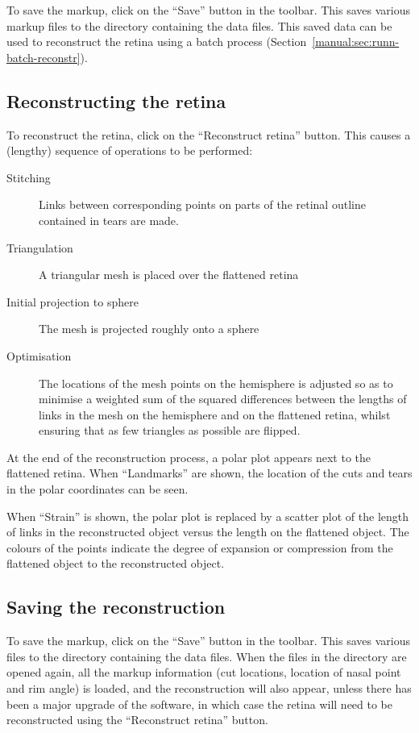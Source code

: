 \documentclass{article}
\begin{document}
To save the markup, click on the ``Save'' button in the toolbar. This
saves various markup files to the directory containing the
data files. This saved data can be used to reconstruct the retina using
a batch process (Section~\ref{manual:sec:runn-batch-reconstr}).

\subsection{Reconstructing the retina}
\label{manual:sec:reconstr-retina}

To reconstruct the retina, click on the ``Reconstruct retina''
button. This causes a (lengthy) sequence of operations to be performed:
\begin{description}
\item[Stitching] Links between corresponding points on parts of the retinal
  outline  contained in tears are made.
\item[Triangulation] A triangular mesh is placed over the flattened retina
\item[Initial projection to sphere ] The mesh is projected roughly
  onto a sphere
\item[Optimisation] The locations of the mesh points on the hemisphere
  is adjusted so as to minimise a weighted sum of the squared
  differences between the lengths of links in the mesh on the
  hemisphere and on the flattened retina, whilst ensuring that as few
  triangles as possible are flipped.
\end{description}

At the end of the reconstruction process, a polar plot appears next to
the flattened retina. When ``Landmarks'' are shown, the location of
the cuts and tears in the polar coordinates can be seen.

When ``Strain'' is shown, the polar plot is replaced by a scatter plot of the
length of links in the reconstructed object versus the length on the
flattened object. The colours of the points indicate the degree of
expansion or compression from the flattened object to the
reconstructed object.

\subsection{Saving the reconstruction}
\label{manual:sec:saving-reconstr}

To save the markup, click on the ``Save'' button in the toolbar. This
saves various files to the directory containing the data files. When
the files in the directory are opened again, all the markup
information (cut locations, location of nasal point and rim angle) is
loaded, and the reconstruction will also appear, unless there has been
a major upgrade of the software, in which case the retina will need to
be reconstructed using the ``Reconstruct retina'' button.
\end{document}
